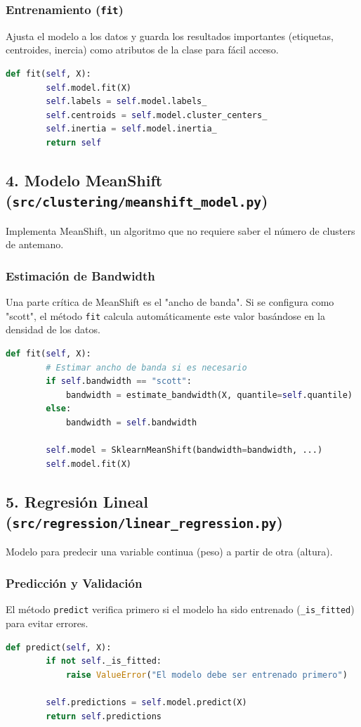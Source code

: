 \documentclass[12pt, a4paper]{article}
\begin{document}
\subsubsection{Entrenamiento (\texttt{fit})}
Ajusta el modelo a los datos y guarda los resultados importantes (etiquetas, centroides, inercia) como atributos de la clase para fácil acceso.
\begin{lstlisting}[language=Python]
    def fit(self, X):
        self.model.fit(X)
        self.labels = self.model.labels_
        self.centroids = self.model.cluster_centers_
        self.inertia = self.model.inertia_
        return self
\end{lstlisting}

\newpage
\subsection{4. Modelo MeanShift (\texttt{src/clustering/meanshift\_model.py})}
Implementa MeanShift, un algoritmo que no requiere saber el número de clusters de antemano.

\subsubsection{Estimación de Bandwidth}
Una parte crítica de MeanShift es el "ancho de banda". Si se configura como "scott", el método \texttt{fit} calcula automáticamente este valor basándose en la densidad de los datos.
\begin{lstlisting}[language=Python]
    def fit(self, X):
        # Estimar ancho de banda si es necesario
        if self.bandwidth == "scott":
            bandwidth = estimate_bandwidth(X, quantile=self.quantile)
        else:
            bandwidth = self.bandwidth
        
        self.model = SklearnMeanShift(bandwidth=bandwidth, ...)
        self.model.fit(X)
\end{lstlisting}

\newpage
\subsection{5. Regresión Lineal (\texttt{src/regression/linear\_regression.py})}
Modelo para predecir una variable continua (peso) a partir de otra (altura).

\subsubsection{Predicción y Validación}
El método \texttt{predict} verifica primero si el modelo ha sido entrenado (\texttt{\_is\_fitted}) para evitar errores.
\begin{lstlisting}[language=Python]
    def predict(self, X):
        if not self._is_fitted:
            raise ValueError("El modelo debe ser entrenado primero")
        
        self.predictions = self.model.predict(X)
        return self.predictions
\end{lstlisting}
\end{document}
